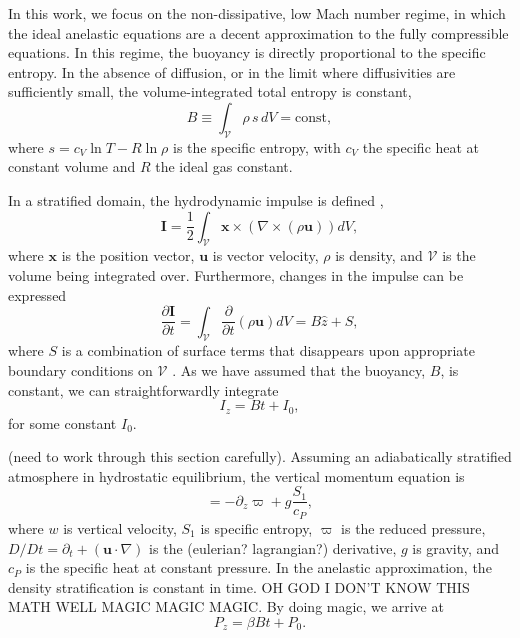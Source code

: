 \documentclass[twocolumn, amsmath, amsfonts, amssymb, trackchanges]{aastex62}
\newcommand{\grad}{\ensuremath{\nabla}}
\begin{document}
In this work, we focus on the non-dissipative, low Mach number regime, 
in which the ideal anelastic equations are a decent approximation to the fully
compressible equations. In this regime, the buoyancy is directly proportional to the
specific entropy. In the absence of diffusion, or in the limit where diffusivities
are sufficiently small, the volume-integrated total entropy is constant,
\begin{equation}
B \equiv \int_{\mathcal{V}} \rho\, s\, dV = \text{const},
\end{equation}
where $s = c_V \ln T - R \ln\rho$ is the specific entropy, with $c_V$ the
specific heat at constant volume and $R$ the ideal gas constant.

In a stratified domain, the hydrodynamic impulse is defined
\citet{shivamoggi2010},
\begin{equation}
\bm{I} = \frac{1}{2}\int_{\mathcal{V}} \bm{x}\times(\grad\times(\rho\bm{u}))dV,
\end{equation}
where $\bm{x}$ is the position vector, $\bm{u}$ is vector velocity, $\rho$ is density,
and $\mathcal{V}$ is the volume being integrated over. Furthermore, changes in the impulse
can be expressed
\begin{equation}
\frac{\partial\bm{I}}{\partial t} = \int_{\mathcal{V}}\frac{\partial}{\partial t}(\rho \bm{u})dV
= B\hat{z} + S,
\end{equation}
where $S$ is a combination of surface terms that disappears upon appropriate boundary conditions
on $\mathcal{V}$ \citep{shivamoggi2010}. As we have assumed that the buoyancy, $B$, is constant,
we can straightforwardly integrate
\begin{equation}
I_z = B t + I_0,
\end{equation}
for some constant $I_0$.

(need to work through this section carefully).
Assuming an adiabatically stratified atmosphere in
hydrostatic equilibrium, the vertical momentum equation is
\begin{equation}
 = - \partial_z \varpi +  g\frac{S_1}{c_P},
\label{eqn:buoyancy}
\end{equation}
where $w$ is vertical velocity, $S_1$ is specific entropy, $\varpi$ is the reduced pressure,
$D/Dt = \partial_t + (\bm{u}\cdot\grad)$ is the (eulerian? lagrangian?)
derivative, $g$ is gravity, and $c_P$ is the specific heat at constant pressure.
In the anelastic approximation, the density stratification is constant in time. 
OH GOD I DON'T KNOW THIS MATH WELL MAGIC MAGIC MAGIC.
By doing magic, we arrive at
\begin{equation}
P_z = \beta B t + P_0.
\end{equation}
\end{document}
